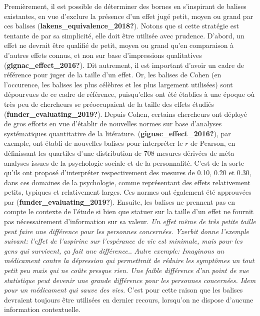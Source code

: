 \documentclass[
  english,
  man]{apa6}
\begin{document}
Premièrement, il est possible de déterminer des bornes en s'inspirant de balises existantes, en vue d'exclure la présence d'un effet jugé petit, moyen ou grand par ces balises (\textbf{lakens\_equivalence\_2018?}). Notons que si cette stratégie est tentante de par sa simplicité, elle doit être utilisée avec prudence. D'abord, un effet ne devrait être qualifié de petit, moyen ou grand qu'en comparaison à d'autres effets connus, et non sur base d'impressions qualitatives (\textbf{gignac\_effect\_2016?}). Dit autrement, il est important d'avoir un cadre de référence pour juger de la taille d'un effet. Or, les balises de Cohen (en l'occurence, les balises les plus célèbres et les plus largement utilisées) sont dépourvues de ce cadre de référence, puisqu'elles ont été établies à une époque où très peu de chercheurs se préoccupaient de la taille des effets étudiés (\textbf{funder\_evaluating\_2019?}). Depuis Cohen, certains chercheurs ont déployé de gros efforts en vue d'établir de nouvelles normes sur base d'analyses systématiques quantitative de la litérature. (\textbf{gignac\_effect\_2016?}), par exemple, ont établi de nouvelles balises pour interpréter le \(r\) de Pearson, en définissant les quartiles d'une distribution de 708 mesures dérivées de méta-analyses issues de la psychologie sociale et de la personnalité. C'est de la sorte qu'ils ont proposé d'interpréter respectivement des mesures de 0.10, 0.20 et 0.30, dans ces domaines de la psychologie, comme représentant des effets relativement petits, typiques et relativement larges. Ces normes ont également été approuvées par (\textbf{funder\_evaluating\_2019?}). Ensuite, les balises ne prennent pas en compte le contexte de l'étude si bien que statuer sur la taille d'un effet ne fournit pas nécessairement d'information sur sa valeur. \emph{Un effet même de très petite taille peut faire une différence pour les personnes concernées. Yzerbit donne l'exemple suivant: l'effet de l'aspirine sur l'espérance de vie est minimale, mais pour les gens qui survivent, ça fait une différence.}. \emph{Autre exemple: Imaginons un médicament contre la dépression qui permettrait de réduire les symptômes un tout petit peu mais qui ne coûte presque rien. Une faible différence d'un point de vue statistique peut devenir une grande différence pour les personnes concernées. Idem pour un médicament qui sauve des vies}. C'est pour cette raison que les balises devraient toujours être utilisées en dernier recours, lorsqu'on ne dispose d'aucune information contextuelle.
\end{document}
